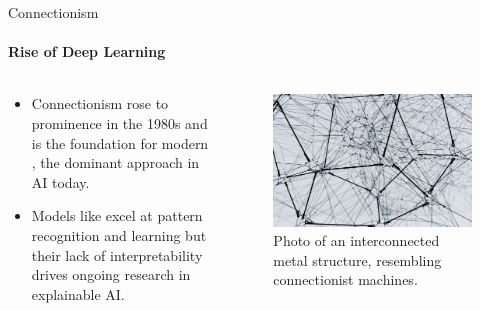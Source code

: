 \begin{frame}{Connectionism}
    \framesubtitle{Rise of Deep Learning}
    \begin{columns}[c]
        \begin{column}{0.6\linewidth}
            \begin{itemize}
                \item Connectionism rose to prominence in the 1980s and is the foundation for modern , the dominant approach in AI today.
                \item Models like  excel at pattern recognition and learning but their lack of interpretability drives ongoing research in explainable AI.
            \end{itemize}
        \end{column}
        \begin{column}{0.4\linewidth}
            \begin{figure}
                \centering
                \includegraphics[width=\columnwidth]{images/connectionism.jpg}
                \caption{Photo of an interconnected metal structure, resembling connectionist machines. }
            \end{figure}
        \end{column}
    \end{columns}
\end{frame}